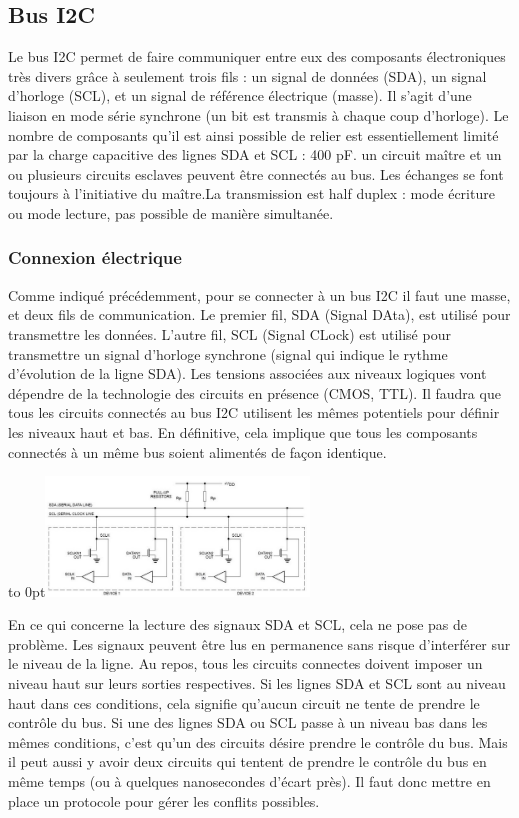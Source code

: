 \documentclass[french,a4paper,12pt]{report}
\begin{document}
 \subsection{Bus I2C}
Le bus I2C permet de faire communiquer entre eux des composants électroniques très divers grâce à seulement trois fils : un signal de données (SDA), un signal d'horloge (SCL), et un signal de référence électrique (masse).
Il s'agit d'une liaison en mode série synchrone (un bit est transmis à chaque coup d’horloge). Le nombre de composants qu'il est ainsi possible de relier est essentiellement limité par la charge capacitive des lignes SDA et SCL : 400 pF.
un circuit maître et un ou plusieurs circuits esclaves peuvent être connectés au bus. Les échanges se font toujours à l’initiative du maître.La transmission est half duplex : mode écriture ou mode lecture, pas possible de manière simultanée.

  \subsubsection{Connexion électrique}
Comme indiqué précédemment, pour se connecter à un bus I2C il faut une masse, et deux fils de communication. Le premier fil, SDA (Signal DAta), est utilisé pour transmettre les données. L'autre fil, SCL (Signal CLock) est utilisé pour transmettre un signal d'horloge synchrone (signal qui indique le rythme d'évolution de la ligne SDA). Les tensions associées aux niveaux logiques vont dépendre de la technologie des circuits en présence (CMOS, TTL). Il faudra que tous les circuits connectés au bus I2C utilisent les mêmes potentiels pour définir les niveaux haut et bas. En définitive, cela implique que tous les composants connectés à un même bus soient alimentés de façon identique.

\hfill\hbox to 0pt{\hss\includegraphics[width=7cm]{SPI5.png}\hss}\hfill\null\newline

En ce qui concerne la lecture des signaux SDA et SCL, cela ne pose pas de problème. Les signaux peuvent être lus en permanence sans risque d'interférer sur le niveau de la ligne.
Au repos, tous les circuits connectes doivent imposer un niveau haut sur leurs sorties respectives. Si les lignes SDA et SCL sont au niveau haut dans ces conditions, cela signifie qu'aucun circuit ne tente de prendre le contrôle du bus. Si une des lignes SDA ou SCL passe à un niveau bas dans les mêmes conditions, c'est qu'un des circuits désire prendre le contrôle du bus. Mais il peut aussi y avoir deux circuits qui tentent de prendre le contrôle du bus en même temps (ou à quelques nanosecondes d'écart près). Il faut donc mettre en place un protocole pour gérer les conflits possibles.
\end{document}
